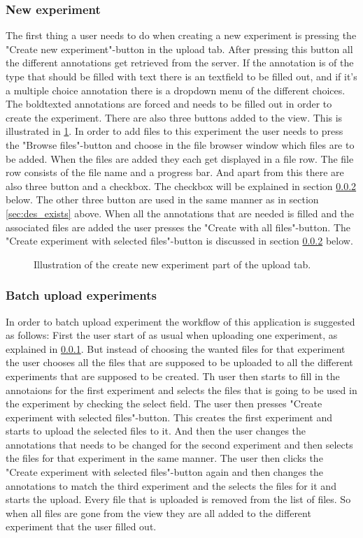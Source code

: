 \subsubsection{New experiment}
\label{sec:des_create}
The first thing a user needs to do when creating a new experiment is pressing the "Create new experiment"-button in the upload tab. After pressing this button all the different annotations get retrieved from the server. If the annotation is of the type that should be filled with text there is an textfield to be filled out, and if it's a multiple choice annotation there is a dropdown menu of the different choices. The boldtexted annotations are forced and needs to be filled out in order to create the experiment. There are also three buttons added to the view. This is illustrated in \ref{fig:des_upload-new}. In order to add files to this experiment the user needs to press the "Browse files"-button and choose in the file browser window which files are to be added. When the files are added they each get displayed in a file row. The file row consists of the file name and a progress bar. And apart from this there are also three button and a checkbox. The checkbox will be explained in section \ref{sec:des_batch} below. The other three button are used in the same manner as in section \ref{sec:des_exists} above. When all the annotations that are needed is filled and the associated files are added the user presses the "Create with all files"-button. The "Create experiment with selected files"-button is discussed in section \ref{sec:des_batch} below.
\\
\begin{figure}[h]
	\caption{Illustration of the create new experiment part of the upload tab.}
	\label{fig:des_upload-new}
\end{figure}
\subsubsection{Batch upload experiments}
\label{sec:des_batch}
In order to batch upload experiment the workflow of this application is suggested as follows:
First the user start of as usual when uploading one experiment, as explained in \ref{sec:des_create}. But instead of choosing the wanted files for that experiment the user chooses all the files that are supposed to be uploaded to all the different experiments that are supposed to be created. Th user then starts to fill in the annotaions for the first experiment and selects the files that is going to be used in the experiment by checking the select field. The user then presses "Create experiment with selected files"-button. This creates the first experiment and starts to upload the selected files to it. And then the user changes the annotations that needs to be changed for the second experiment and then selects the files for that experiment in the same manner. The user then clicks the "Create experiment with selected files"-button again and then changes the annotations to match the third experiment and the selects the files for it and starts the upload. Every file that is uploaded is removed from the list of files. So when all files are gone from the view they are all added to the different experiment that the user filled out.

